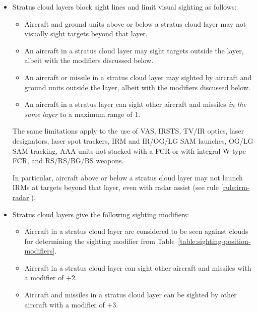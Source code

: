 \begin{advancedrules}
{\begin{itemize}

\item{} Stratus cloud layers block sight lines and limit visual sighting as follows:

\begin{itemize}
\item
Aircraft and ground units above or below a stratus cloud layer may not visually sight targets beyond that layer.

\item An aircraft in a stratus cloud layer may sight targets outside the layer, albeit with the modifiers discussed below.

\item An aircraft or missile in a stratus cloud layer may sighted by aircraft and ground units outside the layer, albeit with the modifiers discussed below.

\item An aircraft in a stratus layer can sight other aircraft and missiles \emph{in the same layer} to a maximum range of 1.
\end{itemize}

The same limitations apply to the use of VAS, IRSTS, TV/IR optics, laser designators, laser spot trackers, IRM and IR/OG/LG SAM launches, OG/LG SAM tracking, AAA units not stacked with a FCR or with integral W-type FCR, and RS/RS/BG/BS weapons. 

In particular, aircraft above or below a stratus cloud layer may not launch IRMs at targets beyond that layer, even with radar assist (see rule \ref{rule:irm-radar}).

\item{} Stratus cloud layers give the following sighting modifiers:
\begin{itemize}

\item Aircraft in a stratus cloud layer are considered to be seen against clouds for determining the sighting modifier from Table~\ref{table:sighting-position-modifiers}.

\item
Aircraft in a stratus cloud layer can sight other aircraft and missiles with a modifier of $+2$.

\item Aircraft and missiles in a stratus cloud layer can be sighted by other aircraft with a modifier of $+3$. 


\end{itemize}
\end{itemize}}
\end{advancedrules}
